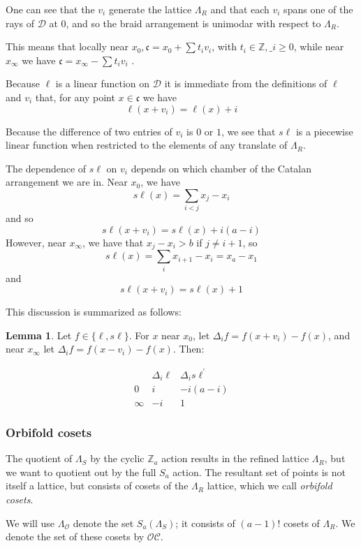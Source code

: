 \documentclass{amsart}[12pt]
\theoremstyle{definition}
\newtheorem{lemma}[dummy]{Lemma}
\newcommand{\Z}{\mathbb{Z}}
\newcommand{\sk}{s\ell}
\newcommand{\cone}{\mathfrak{c}}
\newcommand{\polyh}{\mathfrak{c}}
\newcommand{\dominant}{\mathcal{D}}
\begin{document}
One can see that the $v_i$ generate the lattice $\Lambda_R$ and that each $v_i$ spans one of the rays of $\dominant$ at $0$, and so the braid arrangement is unimodar with respect to $\Lambda_R$.


This means that locally near $x_0, \polyh=x_0+\sum t_i v_i$, with $t_i\in\Z, \_i\geq 0$, while near $x_\infty$ we have $\cone=x_\infty-\sum t_iv_i$ .

Because $\ell$ is a linear function on $\dominant$ it is immediate from the definitions of $\ell$ and $v_i$ that, for any point $x\in\cone$ we have  
$$\ell(x+v_i)=\ell(x)+i$$

Because the difference of two entries of $v_i$ is $0$ or $1$, we see that $\sk$ is a piecewise linear function when restricted to the elements of any translate of $\Lambda_R$.

The dependence of $\sk$ on $v_i$ depends on which chamber of the Catalan arrangement we are in.  Near $x_0$, we have $$\sk(x)=\sum_{i<j} x_j-x_i$$ and so
$$\sk(x+v_i) = \sk(x)+i(a-i)$$
However, near $x_\infty$, we have that $x_j-x_i>b$ if $j\neq i+1$, so 
$$\sk(x)=\sum_i x_{i+1}-x_i=x_a-x_1$$ and
$$\sk(x+v_i)=\sk(x)+1$$

This discussion is summarized as follows:

\begin{lemma} \label{lem:table}
Let $f\in\{\ell,\sk\}$.  For $x$ near $x_0$, let $\Delta_if=f(x+v_i)-f(x)$, and near $x_\infty$ let $\Delta_if=f(x-v_i)-f(x)$.  Then:

$$\begin{array}{r|cc}
 & \Delta_i\ell & \Delta_i\sk^\prime \\
\hline
0 & i & -i(a-i) \\
\infty & -i & 1
\end{array}
$$
\end{lemma}


\subsubsection{Orbifold cosets}

The quotient of $\Lambda_S$ by the cyclic $\Z_a$ action results in the refined lattice $\Lambda_R$, but we want to quotient out by the full $S_a$ action.  The resultant set of points is not itself a lattice, but consists of cosets of the $\Lambda_R$ lattice, which we call \emph{orbifold cosets}.  

We will use $\Lambda_{\mathcal{O}}$ denote the set $S_a(\Lambda_S)$; it consists of $(a-1)!$ cosets of $\Lambda_R$.  We denote the set of these cosets by $\mathcal{OC}$.
\end{document}
